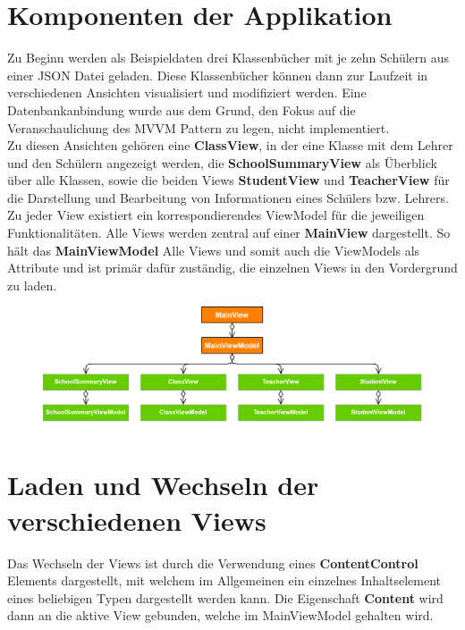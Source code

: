\documentclass[titlepage=false,12pt]{scrreprt}
\begin{document}
\section{Komponenten der Applikation}
Zu Beginn werden als Beispieldaten drei Klassenbücher mit je zehn Schülern aus einer JSON Datei geladen.
Diese Klassenbücher können dann zur Laufzeit in verschiedenen Ansichten visualisiert und modifiziert werden.
Eine Datenbankanbindung wurde aus dem Grund, den Fokus auf die Veranschaulichung des MVVM Pattern zu legen,
nicht implementiert.\\
\noindent
Zu diesen Ansichten gehören eine \textbf{ClassView}, in der eine Klasse mit dem Lehrer und den Schülern
angezeigt werden, die \textbf{SchoolSummaryView} als Überblick über alle Klassen, sowie die beiden Views
\textbf{StudentView} und \textbf{TeacherView} für die Darstellung und Bearbeitung von Informationen eines
Schülers bzw. Lehrers. Zu jeder View existiert ein korrespondierendes ViewModel für die jeweiligen Funktionalitäten.
Alle Views werden zentral auf einer \textbf{MainView} dargestellt. So hält das \textbf{MainViewModel} Alle Views und somit
auch die ViewModels als Attribute und ist primär dafür zuständig, die einzelnen Views in den Vordergrund zu laden.

\begin{figure}[h]
	\includegraphics[width=\textwidth]{ComponentUML.png}
\end{figure}

\section{Laden und Wechseln der verschiedenen Views}
Das Wechseln der Views ist durch die Verwendung eines \textbf{ContentControl} Elements dargestellt, mit welchem
im Allgemeinen ein einzelnes Inhaltselement eines beliebigen Typen dargestellt werden kann. Die Eigenschaft \textbf{Content}
wird dann an die aktive View gebunden, welche im MainViewModel gehalten wird.


\end{document}
